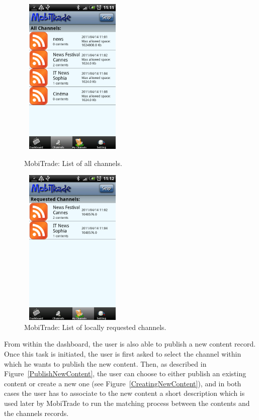 \begin{figure}[!h]
\begin{minipage}[l]{0.3\linewidth}
\centering
\includegraphics[width=2in,height=3in]{Chapitre6/ListAllChannels.png}
\begin{minipage}[l]{1\linewidth}
\small
\caption{MobiTrade: List of all channels.}
\normalsize
\label{ListAllChannels}
\end{minipage}
\end{minipage}
\hspace{2.1cm}
\begin{minipage}[l]{0.3\linewidth}
\centering
\includegraphics[width=2in,height=3in]{Chapitre6/ListRequestedChannels.png}
\begin{minipage}[l]{1\linewidth}
\caption{MobiTrade: List of locally requested channels.}
\label{ListRequestedChannels}
\end{minipage}
\end{minipage}
\end{figure}

From within the dashboard, the user is also able to publish a new content record. Once this task is initiated, the user is first asked to select the channel within which he wants to publish the new content. Then, as described in Figure~\ref{PublishNewContent}, the user can choose to either publish an existing content or create a new one (see Figure~\ref{CreatingNewContent}), and in both cases the user has to associate to the new content a short description which is used later by MobiTrade to run the matching process between the contents and the channels records.


